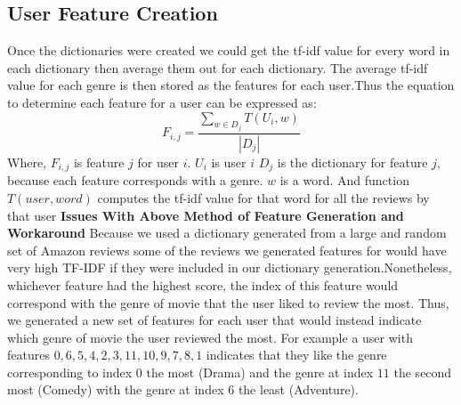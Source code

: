 \documentclass{article}
\begin{document}
\subsection{User Feature Creation}
Once the dictionaries were created we could get the tf-idf value for every word in each dictionary then average them out for each dictionary. The average tf-idf value for each genre is then stored as the features for each user.Thus the equation to determine each feature for a user can be expressed as:
$$F_{i,j} = \frac{\sum\limits_{w \in D_j} T(U_i, w)}{|D_j|}$$
Where, $F_{i,j}$ is feature $j$ for user $i$.\newline
$U_i$ is user $i$\newline
$D_j$ is the dictionary for feature $j$, because each feature corresponds with a genre. \newline
$w$ is a word. \newline
And function $T(user, word)$ computes the tf-idf value for that word for all the reviews by that user\newline\newline
\textbf{Issues With Above Method of Feature Generation and Workaround}\newline
Because we used a dictionary generated from a large and random set of Amazon reviews some of the reviews we generated features for would have very high TF-IDF if they were included in our dictionary generation.Nonetheless, whichever feature had the highest score, the index of this feature would correspond with the genre of movie that the user liked to review the most. Thus, we generated a new set of features for each user that would instead indicate which genre of movie the user reviewed the most. For example a user with features $0,6,5,4,2,3,11,10,9,7,8,1$ indicates that they like the genre corresponding to index $0$ the most (Drama) and the genre at index $11$ the second most (Comedy) with the genre at index $6$ the least (Adventure).  
\end{document}
